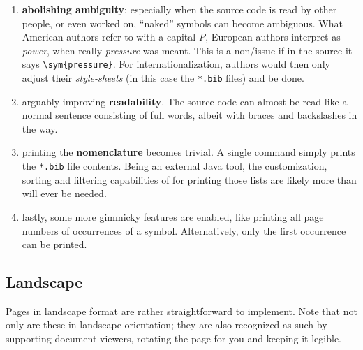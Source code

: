 \begin{enumerate}
        Yet, what is \emph{meant} is \emph{emphasis}; italic text is just what it
        happens to look like now, but it is not the \emph{meaning}.
        For example, we could later decide to redefine emphasized text to bold,
        or colored.
        If you previously did not differentiate strictly enough between
        \verb|\emph| and \verb|\textit|, you are in for a bad time.
        This is a trap beginners unfortunately often fall into.
        Using , abstracted markup\-/commands can be
        taken to a whole next level, leveraging this core \LaTeX{} strength.
    \item \textbf{abolishing ambiguity}:
        especially when the source code is read by other people, or even worked on,
        \enquote{naked} symbols can become ambiguous.
        What American authors refer to with a capital \emph{P}, European authors
        interpret as \emph{power}, when really \emph{pressure} was meant.
        This is a non\-/issue if in the source it says \verb|\sym{pressure}|.
        For internationalization, authors would then only adjust their
        \emph{style-sheets} (in this case the \texttt{*.bib} files) and be done.
    \item arguably improving \textbf{readability}.
        The source code can almost be read like a normal sentence consisting of full
        words, albeit with braces and backslashes in the way.
    \item printing the \textbf{nomenclature} becomes trivial.
        A single command simply prints the \texttt{*.bib} file contents.
        Being an external Java tool, the customization, sorting and filtering
        capabilities of  for printing those lists are likely
        more than will ever be needed.
    \item lastly, some more gimmicky features are enabled, like printing all
        page numbers of occurrences of a symbol.
        Alternatively, only the first occurrence can be printed.
\end{enumerate}

\begin{landscape}
    \section{Landscape}

    Pages in landscape format are rather straightforward to implement.
    Note that not only are these in landscape orientation; they are also recognized
    as such by supporting document viewers, rotating the page for you and keeping
    it legible.
\end{landscape}
